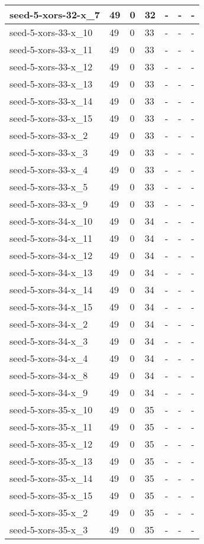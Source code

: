 \begin{scriptsize}
\begin{longtable}{|p{5cm}|l|l|l|l|l|l|}
seed-5-xors-32-x\_7&49&0&32&-&-&- \\ \hline 
seed-5-xors-33-x\_10&49&0&33&-&-&- \\ \hline 
seed-5-xors-33-x\_11&49&0&33&-&-&- \\ \hline 
seed-5-xors-33-x\_12&49&0&33&-&-&- \\ \hline 
seed-5-xors-33-x\_13&49&0&33&-&-&- \\ \hline 
seed-5-xors-33-x\_14&49&0&33&-&-&- \\ \hline 
seed-5-xors-33-x\_15&49&0&33&-&-&- \\ \hline 
seed-5-xors-33-x\_2&49&0&33&-&-&- \\ \hline 
seed-5-xors-33-x\_3&49&0&33&-&-&- \\ \hline 
seed-5-xors-33-x\_4&49&0&33&-&-&- \\ \hline 
seed-5-xors-33-x\_5&49&0&33&-&-&- \\ \hline 
seed-5-xors-33-x\_9&49&0&33&-&-&- \\ \hline 
seed-5-xors-34-x\_10&49&0&34&-&-&- \\ \hline 
seed-5-xors-34-x\_11&49&0&34&-&-&- \\ \hline 
seed-5-xors-34-x\_12&49&0&34&-&-&- \\ \hline 
seed-5-xors-34-x\_13&49&0&34&-&-&- \\ \hline 
seed-5-xors-34-x\_14&49&0&34&-&-&- \\ \hline 
seed-5-xors-34-x\_15&49&0&34&-&-&- \\ \hline 
seed-5-xors-34-x\_2&49&0&34&-&-&- \\ \hline 
seed-5-xors-34-x\_3&49&0&34&-&-&- \\ \hline 
seed-5-xors-34-x\_4&49&0&34&-&-&- \\ \hline 
seed-5-xors-34-x\_8&49&0&34&-&-&- \\ \hline 
seed-5-xors-34-x\_9&49&0&34&-&-&- \\ \hline 
seed-5-xors-35-x\_10&49&0&35&-&-&- \\ \hline 
seed-5-xors-35-x\_11&49&0&35&-&-&- \\ \hline 
seed-5-xors-35-x\_12&49&0&35&-&-&- \\ \hline 
seed-5-xors-35-x\_13&49&0&35&-&-&- \\ \hline 
seed-5-xors-35-x\_14&49&0&35&-&-&- \\ \hline 
seed-5-xors-35-x\_15&49&0&35&-&-&- \\ \hline 
seed-5-xors-35-x\_2&49&0&35&-&-&- \\ \hline 
seed-5-xors-35-x\_3&49&0&35&-&-&- \\ \hline 

\end{longtable}
\end{scriptsize}
